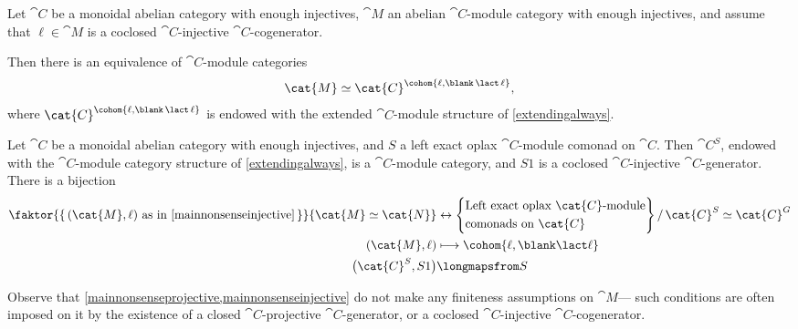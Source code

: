 \begin{theorem}\label{mainnonsenseinjective}
  Let \(\cat{C}\) be a monoidal abelian category with enough injectives,
  \(\cat{M}\) an abelian \(\cat{C}\)\hyp{}module category with enough injectives,
  and assume that \(\ell \in \cat{M}\) is a coclosed \(\cat{C}\)\hyp{}injective \(\cat{C}\)\hyp{}cogenerator.

  Then there is an equivalence of \(\cat{C}\)\hyp{}module categories
  \[
    \cat{M} \simeq \cat{C}^{\cohom{\ell, \blank \,\lact\, \ell}},
  \]
  where \(\cat{C}^{\cohom{\ell, \blank \,\lact\, \ell}}\) is endowed with the extended \(\cat{C}\)\hyp{}module structure of \cref{extendingalways}.
\end{theorem}

\begin{theorem}\label{injcorrespondence}
  Let \(\cat{C}\) be a monoidal abelian category with enough injectives,
  and \(S\) a left exact oplax \(\cat{C}\)\hyp{}module comonad on \(\cat{C}\).
  Then \(\cat{C}^{S}\),
  endowed with the \(\cat{C}\)\hyp{}module category structure of \cref{extendingalways},
  is a \(\cat{C}\)\hyp{}module category,
  and \(S 1\) is a coclosed \(\cat{C}\)\hyp{}injective \(\cat{C}\)\hyp{}generator.
  There is a bijection
  \begin{align*}
    \faktor{\{\,(\cat{M}, \ell)\ \text{as in \cref{mainnonsenseinjective}}\,\}}{\cat{M} \simeq \cat{N}}
    &\leftrightarrow
    \left\{
      \begin{aligned}
        &\text{Left exact oplax}\ \cat{C}\text{-module}\\
        &\text{comonads on}\ \cat{C}
      \end{aligned}
      \right\}
      /\, \cat{C}^{S} \simeq \cat{C}^{G} \\
    (\cat{M},\ell) &\longmapsto \cohom{\ell, \blank \lact \ell} \\
    \big(\cat{C}^{S}, S 1\big) &\longmapsfrom S
  \end{align*}
\end{theorem}

Observe that \cref{mainnonsenseprojective,mainnonsenseinjective} do not make any finiteness assumptions on \(\cat{M}\)—%
such conditions are often imposed on it by the existence of a closed \(\cat{C}\)\hyp{}projective \(\cat{C}\)\hyp{}generator,
or a coclosed \(\cat{C}\)\hyp{}injective \(\cat{C}\)\hyp{}cogenerator.

